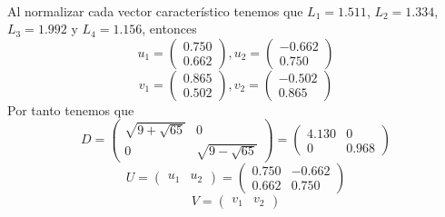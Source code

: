 \documentclass[12pt, letterpaper]{article}
\begin{document}
\begin{enumerate}
\begin{equation*}
\begin{aligned}
        \end{aligned}
    \end{equation*}
    Al normalizar cada vector característico tenemos que $L_{1} = 1.511$, $L_{2} = 1.334$, $L_{3} = 1.992$ y $L_{4} = 1.156$, entonces
    \begin{equation*}
        u_{1} = \begin{pmatrix}
            0.750 \\
            0.662
        \end{pmatrix},
        u_{2} = \begin{pmatrix}
            -0.662 \\
            0.750
        \end{pmatrix}
    \end{equation*}
    \begin{equation*}
        v_{1} = \begin{pmatrix}
            0.865 \\
            0.502
        \end{pmatrix},
        v_{2} = \begin{pmatrix}
            -0.502 \\
            0.865
        \end{pmatrix}
    \end{equation*}
    Por tanto tenemos que
    \begin{equation*}
        D = \begin{pmatrix}
            \sqrt{9+\sqrt{65}} & 0 \\
            0 & \sqrt{9-\sqrt{65}}
        \end{pmatrix}
        = \begin{pmatrix}
            4.130 & 0 \\
            0 & 0.968
        \end{pmatrix}
    \end{equation*}
    \begin{equation*}
        U = \begin{pmatrix}
            u_{1} & u_{2}
        \end{pmatrix}
        = \begin{pmatrix}
            0.750 & -0.662 \\
            0.662 & 0.750
        \end{pmatrix}
    \end{equation*}
    \begin{equation*}
        V = \begin{pmatrix}
            v_{1} & v_{2}

\end{pmatrix}
\end{equation*}
\end{enumerate}
\end{document}
